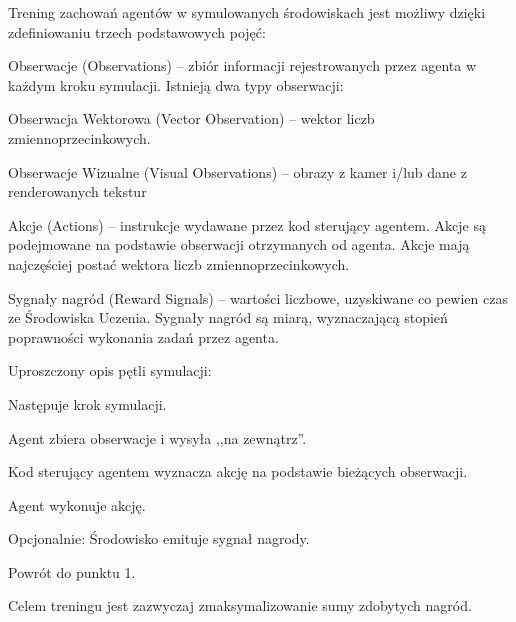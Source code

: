 \vspace{1cm}
Trening zachowań agentów w symulowanych środowiskach jest możliwy dzięki zdefiniowaniu trzech podstawowych pojęć:
\begin{enumerate*}
\item Obserwacje (Observations) -- zbiór informacji rejestrowanych przez agenta w każdym kroku symulacji. 
Istnieją dwa typy obserwacji:
\begin{itemize*}
\item Obserwacja Wektorowa (Vector Observation) -- wektor liczb zmiennoprzecinkowych.
\item Obserwacje Wizualne (Visual Observations) -- obrazy z kamer i/lub dane z renderowanych tekstur
\end{itemize*}
\item Akcje (Actions) -- instrukcje wydawane przez kod sterujący agentem. Akcje są podejmowane na podstawie obserwacji otrzymanych od agenta. Akcje mają najczęściej postać wektora liczb zmiennoprzecinkowych.
\item Sygnały nagród (Reward Signals) -- wartości liczbowe, uzyskiwane co pewien czas ze Środowiska Uczenia. Sygnały nagród są miarą, wyznaczającą stopień poprawności wykonania zadań przez agenta.
\end{enumerate*}

Uproszczony opis pętli symulacji:
\begin{enumerate*}
\item Następuje krok symulacji.
\item Agent zbiera obserwacje i wysyła ,,na zewnątrz''.
\item Kod sterujący agentem wyznacza akcję na podstawie bieżących obserwacji.
\item Agent wykonuje akcję.
\item Opcjonalnie: Środowisko emituje sygnał nagrody.
\item Powrót do punktu 1.
\end{enumerate*}
Celem treningu jest zazwyczaj zmaksymalizowanie sumy zdobytych nagród.

